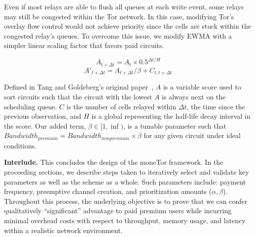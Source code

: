 Even if most relays are able to flush all queues at each write event, some
relays may still be congested within the Tor network. In this case, modifying
Tor's overlay flow control would not achieve priority since the cells are stuck
within the congested relay's queues. To overcome this issue, we modify EWMA with
a simpler linear scaling factor that favors paid circuits.

\begin{equation}
  A_{t + \Delta t} = A_t \times 0.5^{\Delta t/H}
\end{equation}
\begin{equation}
  A'_{t + \Delta t} = A_{t + \Delta t} / \beta + C_{t, t + \Delta t}
\end{equation}

Defined in Tang and Goldeberg's original paper~\cite{tang2010improved}, $A$ is a
variable score used to sort circuits such that the circuit with the lowest $A$
is always next on the scheduling queue. $C$ is the number of cells relayed
within $\Delta t$, the time since the previous observation, and $H$ is a global
representing the half-life decay interval in the score. Our added term, $\beta
\in [1, \inf)$, is a tunable parameter such that $Bandwidth_{premium} =
  Bandwidth_{nonpremium} \times \beta$ for any given circuit under ideal
  conditions.


  \medskip
  \noindent \textbf{Interlude.}
  This concludes the design of the moneTor framework. In
the proceeding sections, we describe steps taken to iteratively select and
validate key parameters as well as the scheme as a whole. Such parameters
include: payment frequency, preemptive channel creation, and prioritization
amounts ($\alpha, \beta$). Throughout this process, the underlying objective is
to prove that we can confer qualitatively ``significant'' advantage to paid
premium users while incurring minimal overhead costs with respect to throughput,
memory usage, and latency within a realistic network environment.



